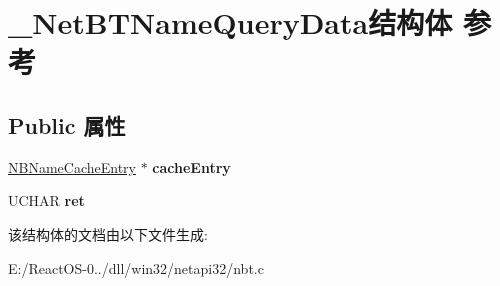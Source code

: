 \hypertarget{struct___net_b_t_name_query_data}{}\section{\+\_\+\+Net\+B\+T\+Name\+Query\+Data结构体 参考}
\label{struct___net_b_t_name_query_data}
\subsection*{Public 属性}
\begin{DoxyCompactItemize}
\item 
\mbox{\label{struct___net_b_t_name_query_data_a5ae5345ee67c3dca657d23399dca0027}} 
\hyperlink{struct___n_b_name_cache_entry}{N\+B\+Name\+Cache\+Entry} $\ast$ {\bfseries cache\+Entry}
\item 
\mbox{\label{struct___net_b_t_name_query_data_abce44eb039e840b4f74f61a1475ecd50}} 
U\+C\+H\+AR {\bfseries ret}
\end{DoxyCompactItemize}


该结构体的文档由以下文件生成\+:\begin{DoxyCompactItemize}
\item 
E\+:/\+React\+O\+S-\/0../dll/win32/netapi32/nbt.\+c\end{DoxyCompactItemize}

